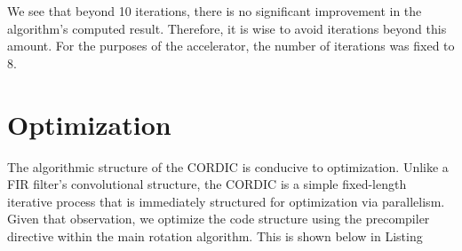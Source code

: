 \documentclass[../report_polarFIR.tex]{subfiles}
\begin{document}
We see that beyond 10 iterations, there is no significant improvement in the algorithm's computed result. Therefore, it is wise to avoid iterations beyond this amount. For the purposes of the accelerator, the number of iterations was fixed to 8.


\section{Optimization}

The algorithmic structure of the CORDIC is conducive to optimization. Unlike a FIR filter's convolutional structure, the CORDIC is a simple fixed-length iterative process that is immediately structured for optimization via parallelism.  Given that observation, we optimize the code structure using the precompiler directive  within the main rotation algorithm. This is shown below in Listing
\end{document}
